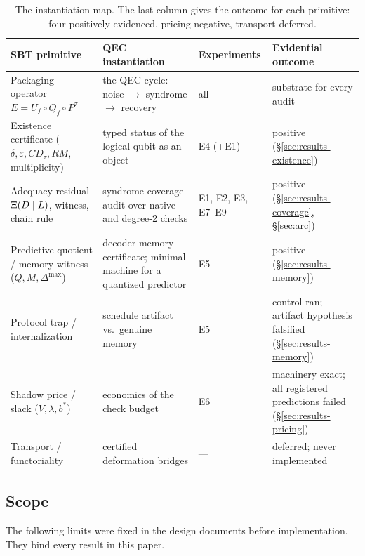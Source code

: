 \begin{table}[htbp]
\centering\small
\begin{tabular}{>{\raggedright\arraybackslash}p{3.6cm} >{\raggedright\arraybackslash}p{4.6cm} >{\raggedright\arraybackslash}p{2.2cm} >{\raggedright\arraybackslash}p{3.4cm}}
\toprule
SBT primitive & QEC instantiation & Experiments & Evidential outcome \\
\midrule
Packaging operator $E = U_f \circ Q_f \circ P^\tau$ & the QEC cycle: noise $\to$ syndrome $\to$ recovery & all & substrate for every audit \\
Existence certificate ($\delta, \varepsilon, CD_\tau, RM$, multiplicity) & typed status of the logical qubit as an object & E4 (+E1) & positive (\S\ref{sec:results-existence}) \\
Adequacy residual $\Xi(D \mid L)$, witness, chain rule & syndrome-coverage audit over native and degree-2 checks & E1, E2, E3, E7--E9 & positive (\S\ref{sec:results-coverage}, \S\ref{sec:arc}) \\
Predictive quotient / memory witness ($Q, M, \Delta^{\max}$) & decoder-memory certificate; minimal machine for a quantized predictor & E5 & positive (\S\ref{sec:results-memory}) \\
Protocol trap / internalization & schedule artifact vs.\ genuine memory & E5 & control ran; artifact hypothesis falsified (\S\ref{sec:results-memory}) \\
Shadow price / slack ($V, \lambda, b^{*}$) & economics of the check budget & E6 & machinery exact; all registered predictions failed (\S\ref{sec:results-pricing}) \\
Transport / functoriality & certified deformation bridges & --- & deferred; never implemented \\
\bottomrule
\end{tabular}
\caption{The instantiation map. The last column gives the outcome for each primitive: four positively evidenced, pricing negative, transport deferred.} %
\label{tab:map}
\end{table}

\subsection{Scope}
\label{sec:fences}

The following limits were fixed in the design documents before implementation. They bind every result in this paper. %

